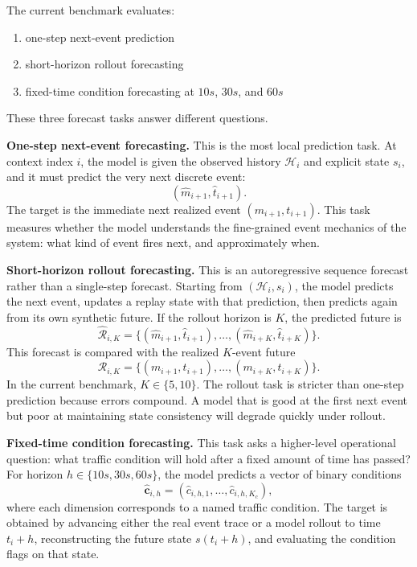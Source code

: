 \documentclass[11pt]{article}
\begin{document}
The current benchmark evaluates:

\begin{enumerate}
  \item one-step next-event prediction
  \item short-horizon rollout forecasting
  \item fixed-time condition forecasting at \(10s\), \(30s\), and \(60s\)
\end{enumerate}

These three forecast tasks answer different questions.

\textbf{One-step next-event forecasting.}
This is the most local prediction task. At context index \(i\), the model is given the observed history \(\mathcal{H}_i\) and explicit state \(s_i\), and it must predict the very next discrete event:
\[
(\hat{m}_{i+1}, \hat{t}_{i+1}).
\]
The target is the immediate next realized event \((m_{i+1}, t_{i+1})\). This task measures whether the model understands the fine-grained event mechanics of the system: what kind of event fires next, and approximately when.

\textbf{Short-horizon rollout forecasting.}
This is an autoregressive sequence forecast rather than a single-step forecast. Starting from \((\mathcal{H}_i, s_i)\), the model predicts the next event, updates a replay state with that prediction, then predicts again from its own synthetic future. If the rollout horizon is \(K\), the predicted future is
\[
\hat{\mathcal{R}}_{i,K}
=
\{(\hat{m}_{i+1}, \hat{t}_{i+1}), \dots, (\hat{m}_{i+K}, \hat{t}_{i+K})\}.
\]
This forecast is compared with the realized \(K\)-event future
\[
\mathcal{R}_{i,K}
=
\{(m_{i+1}, t_{i+1}), \dots, (m_{i+K}, t_{i+K})\}.
\]
In the current benchmark, \(K \in \{5,10\}\). The rollout task is stricter than one-step prediction because errors compound. A model that is good at the first next event but poor at maintaining state consistency will degrade quickly under rollout.

\textbf{Fixed-time condition forecasting.}
This task asks a higher-level operational question: what traffic condition will hold after a fixed amount of time has passed? For horizon \(h \in \{10s,30s,60s\}\), the model predicts a vector of binary conditions
\[
\hat{\mathbf{c}}_{i,h}
=
(\hat{c}_{i,h,1}, \dots, \hat{c}_{i,h,K_c}),
\]
where each dimension corresponds to a named traffic condition. The target is obtained by advancing either the real event trace or a model rollout to time \(t_i + h\), reconstructing the future state \(s(t_i+h)\), and evaluating the condition flags on that state.
\end{document}
